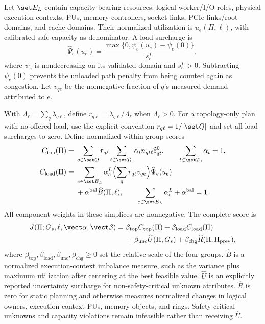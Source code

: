 Let $\set E_L$ contain capacity-bearing resources: logical worker/I/O roles, physical execution contexts, PUs, memory controllers, socket links, PCIe links/root domains, and cache domains. Their normalized utilization is $u_e(\Pi,\ell)$, with calibrated safe capacity as denominator. A load surcharge is
\begin{equation}
 \widehat\Psi_e(u_e)=
 \frac{\max\{0,\psi_e(u_e)-\psi_e(0)\}}{s_e^L},
 \label{eq:congestion-surcharge}
\end{equation}
where $\psi_e$ is nondecreasing on its validated domain and $s_e^L>0$. Subtracting $\psi_e(0)$ prevents the unloaded path penalty from being counted again as congestion. Let $v_{qe}$ be the nonnegative fraction of $q$'s measured demand attributed to $e$.

With $\Lambda_\ell=\sum_q\lambda_{q\ell}$, define $r_{q\ell}=\lambda_{q\ell}/\Lambda_\ell$ when $\Lambda_\ell>0$. For a topology-only plan with no offered load, use the explicit convention $r_{q\ell}=1/|\set Q|$ and set all load surcharges to zero. Define normalized within-group scores
\begin{align}
C_{\mathrm{top}}(\Pi)={}&
 \sum_{q\in\set Q} r_{q\ell}
 \sum_{t\in\set T_0}\alpha_t n_{qt\ell}\widehat z^0_{qt},
 \qquad \sum_{t\in\set T_0}\alpha_t=1, \label{eq:topology-group}\\
C_{\mathrm{load}}(\Pi)={}&
 \sum_{e\in\set E_L}\alpha^L_e
 \Bigl(\sum_q r_{q\ell}v_{qe}\Bigr)\widehat\Psi_e(u_e)\notag\\
&+\alpha^{\mathrm{bal}}\widehat B(\Pi,\ell),\qquad
 \sum_{e\in\set E_L}\alpha^L_e+\alpha^{\mathrm{bal}}=1.
 \label{eq:load-group}
\end{align}
All component weights in these simplices are nonnegative. The complete score is
\begin{align}
J(\Pi;G_s,\ell,\vect\alpha,\vect\beta)={}&
 \beta_{\mathrm{top}}C_{\mathrm{top}}(\Pi)
 +\beta_{\mathrm{load}}C_{\mathrm{load}}(\Pi)\notag\\
&+\beta_{\mathrm{unc}}\widehat U(\Pi,G_s)
 +\beta_{\mathrm{chg}}\widehat R(\Pi,\Pi_{\mathrm{prev}}),
\label{eq:cost}
\end{align}
where $\beta_{\mathrm{top}},\beta_{\mathrm{load}},\beta_{\mathrm{unc}},\beta_{\mathrm{chg}}\geq0$ set the relative scale of the four groups. $\widehat B$ is a normalized execution-context imbalance measure, such as the variance plus maximum utilization after centering at the best feasible value. $\widehat U$ is an explicitly reported uncertainty surcharge for non-safety-critical unknown attributes. $\widehat R$ is zero for static planning and otherwise measures normalized changes in logical owners, execution-context PUs, memory objects, and rings. Safety-critical unknowns and capacity violations remain infeasible rather than receiving $\widehat U$.

